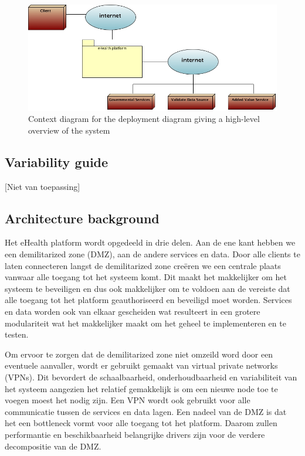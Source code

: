 \documentclass[a4paper,10pt]{article}
\begin{document}
\begin{center}
    \begin{figure}[!h]
      \includegraphics[scale=0.60]{../images/deployment_DMZ_context.jpg}
	\caption{Context diagram for the deployment diagram giving a high-level overview of the system}
    \end{figure}
 \end{center}

\subsection{Variability guide}
[Niet van toepassing]

\subsection{Architecture background}

Het eHealth platform wordt opgedeeld in drie delen. Aan de ene kant hebben we een demilitarized zone (DMZ), aan de andere services en data. Door alle clients te laten connecteren langst de demilitarized zone creëren we een centrale plaats vanwaar alle toegang tot het systeem komt. Dit maakt het makkelijker om het systeem te beveiligen en dus ook makkelijker om te voldoen aan de vereiste dat alle toegang tot het platform geauthoriseerd en beveiligd moet worden. Services en data worden ook van elkaar gescheiden wat resulteert in een grotere modulariteit wat het makkelijker maakt om het geheel te implementeren en te testen.

Om ervoor te zorgen dat de demilitarized zone niet omzeild word door een eventuele aanvaller, wordt er gebruikt gemaakt van virtual private networks (VPNs). Dit bevordert de schaalbaarheid, onderhoudbaarheid en variabiliteit van het systeem aangezien het relatief gemakkelijk is om een nieuwe node toe te voegen moest het nodig zijn. Een VPN wordt ook gebruikt voor alle communicatie tussen de services en data lagen. Een nadeel van de DMZ is dat het een bottleneck vormt voor alle toegang tot het platform. Daarom zullen performantie en beschikbaarheid belangrijke drivers zijn voor de verdere decompositie van de DMZ.
\end{document}
